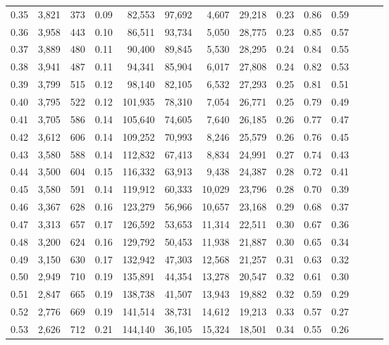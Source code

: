\begin{tabular}{rrrrrrrrrrrrrr}
0.35 &  3,821 &  373 &  0.09 &   82,553 &   97,692 &   4,607 &  29,218 &  0.23 &  0.86 &      0.59 \\
0.36 &  3,958 &  443 &  0.10 &   86,511 &   93,734 &   5,050 &  28,775 &  0.23 &  0.85 &      0.57 \\
0.37 &  3,889 &  480 &  0.11 &   90,400 &   89,845 &   5,530 &  28,295 &  0.24 &  0.84 &      0.55 \\
0.38 &  3,941 &  487 &  0.11 &   94,341 &   85,904 &   6,017 &  27,808 &  0.24 &  0.82 &      0.53 \\
0.39 &  3,799 &  515 &  0.12 &   98,140 &   82,105 &   6,532 &  27,293 &  0.25 &  0.81 &      0.51 \\
0.40 &  3,795 &  522 &  0.12 &  101,935 &   78,310 &   7,054 &  26,771 &  0.25 &  0.79 &      0.49 \\
0.41 &  3,705 &  586 &  0.14 &  105,640 &   74,605 &   7,640 &  26,185 &  0.26 &  0.77 &      0.47 \\
0.42 &  3,612 &  606 &  0.14 &  109,252 &   70,993 &   8,246 &  25,579 &  0.26 &  0.76 &      0.45 \\
0.43 &  3,580 &  588 &  0.14 &  112,832 &   67,413 &   8,834 &  24,991 &  0.27 &  0.74 &      0.43 \\
0.44 &  3,500 &  604 &  0.15 &  116,332 &   63,913 &   9,438 &  24,387 &  0.28 &  0.72 &      0.41 \\
0.45 &  3,580 &  591 &  0.14 &  119,912 &   60,333 &  10,029 &  23,796 &  0.28 &  0.70 &      0.39 \\
0.46 &  3,367 &  628 &  0.16 &  123,279 &   56,966 &  10,657 &  23,168 &  0.29 &  0.68 &      0.37 \\
0.47 &  3,313 &  657 &  0.17 &  126,592 &   53,653 &  11,314 &  22,511 &  0.30 &  0.67 &      0.36 \\
0.48 &  3,200 &  624 &  0.16 &  129,792 &   50,453 &  11,938 &  21,887 &  0.30 &  0.65 &      0.34 \\
0.49 &  3,150 &  630 &  0.17 &  132,942 &   47,303 &  12,568 &  21,257 &  0.31 &  0.63 &      0.32 \\
0.50 &  2,949 &  710 &  0.19 &  135,891 &   44,354 &  13,278 &  20,547 &  0.32 &  0.61 &      0.30 \\
0.51 &  2,847 &  665 &  0.19 &  138,738 &   41,507 &  13,943 &  19,882 &  0.32 &  0.59 &      0.29 \\
0.52 &  2,776 &  669 &  0.19 &  141,514 &   38,731 &  14,612 &  19,213 &  0.33 &  0.57 &      0.27 \\
0.53 &  2,626 &  712 &  0.21 &  144,140 &   36,105 &  15,324 &  18,501 &  0.34 &  0.55 &      0.26 \\

\end{tabular}
